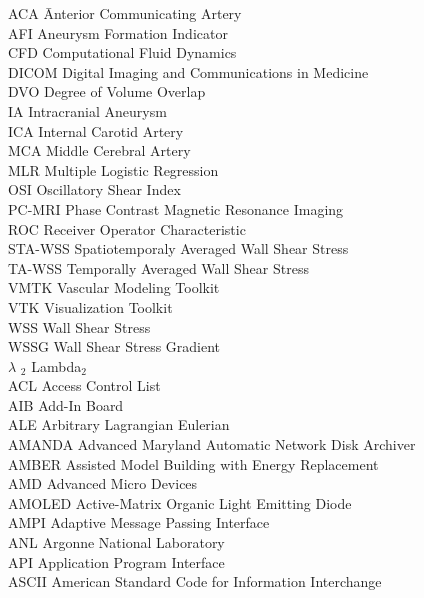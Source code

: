 %
\begin{tabbing}
ACA		\hspace{0.60in} \= Anterior Communicating Artery  \\
AFI		\> Aneurysm Formation Indicator \\
CFD		\> Computational Fluid Dynamics \\
DICOM	\> Digital Imaging and Communications in Medicine \\
DVO		\> Degree of Volume Overlap \\
IA  	\> Intracranial Aneurysm \\
ICA		\> Internal Carotid Artery \\
MCA		\> Middle Cerebral Artery \\
MLR		\> Multiple Logistic Regression \\
OSI		\> Oscillatory Shear Index \\
PC-MRI	\> Phase Contrast Magnetic Resonance Imaging \\
ROC		\> Receiver Operator Characteristic \\
STA-WSS	\> Spatiotemporaly Averaged Wall Shear Stress \\
TA-WSS	\> Temporally Averaged Wall Shear Stress \\
VMTK	\> Vascular Modeling Toolkit \\
VTK		\> Visualization Toolkit \\
WSS		\> Wall Shear Stress \\
WSSG	\> Wall Shear Stress Gradient \\
$\lambda$ $_2$	\> Lambda$_2$ \\
ACL     \> Access Control List\\
AIB     \> Add-In Board\\
ALE     \> Arbitrary Lagrangian Eulerian\\
AMANDA  \> Advanced Maryland Automatic Network Disk Archiver\\
AMBER   \> Assisted Model Building with Energy Replacement\\
AMD     \> Advanced Micro Devices\\
AMOLED  \> Active-Matrix Organic Light Emitting Diode\\
AMPI    \> Adaptive Message Passing Interface\\
ANL     \> Argonne National Laboratory\\
API     \> Application Program Interface\\
ASCII   \> American Standard Code for Information Interchange\\

\end{tabbing}
